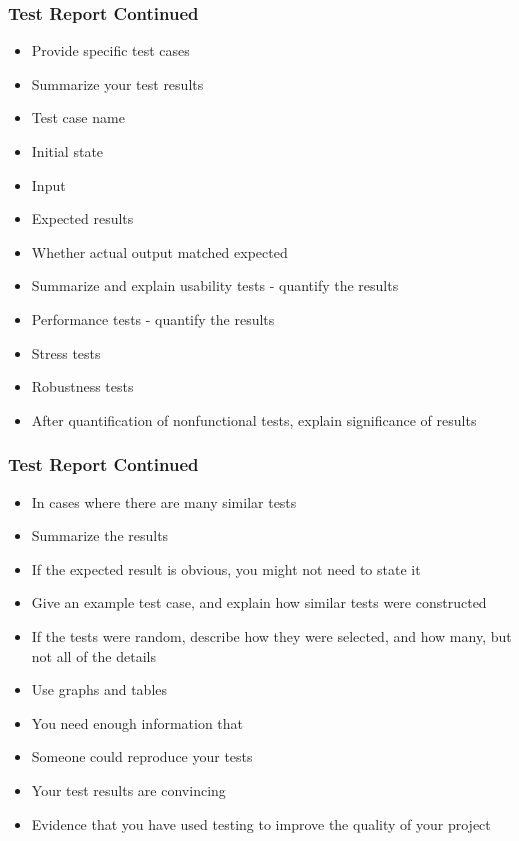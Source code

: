\documentclass[t,12pt,numbers,fleqn]{beamer}
\begin{document}

\begin{frame}
\frametitle{Test Report Continued}
\begin{itemize}
\item Provide specific test cases
\item Summarize your test results
\bi
\item Test case name
\item Initial state
\item Input
\item Expected results
\item Whether actual output matched expected
\ei
\item Summarize and explain usability tests - quantify the results
\item Performance tests - quantify the results
\item Stress tests
\item Robustness tests
\item After quantification of nonfunctional tests, explain significance of
  results
\end{itemize}
\end{frame}


\begin{frame}
\frametitle{Test Report Continued}
\begin{itemize}
\item In cases where there are many similar tests
\bi
\item Summarize the results
\item If the expected result is obvious, you might not need to state it
\item Give an example test case, and explain how similar tests were constructed
\item If the tests were random, describe how they were selected, and how many,
  but not all of the details
\item Use graphs and tables
\item You need enough information that
\bi
\item Someone could reproduce your tests
\item Your test results are convincing
\item Evidence that you have used testing to improve the quality of your project
\ei
\ei
\end{itemize}
\end{frame}
\end{document}
